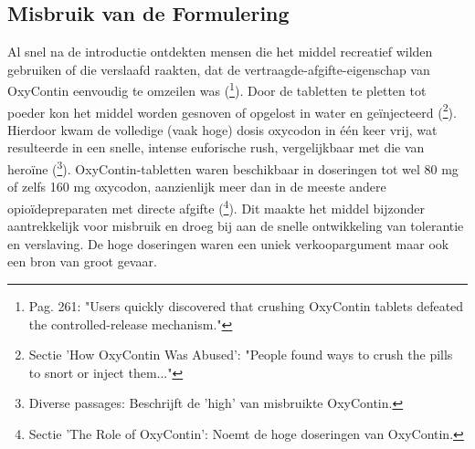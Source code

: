\documentclass[11pt, a4paper]{report} %
\begin{document}
\subsection{Misbruik van de Formulering}
Al snel na de introductie ontdekten mensen die het middel recreatief wilden gebruiken of die verslaafd raakten, dat de vertraagde-afgifte-eigenschap van OxyContin eenvoudig te omzeilen was (\cite{Cicero2017Review}\footnote{Pag. 261: "Users quickly discovered that crushing OxyContin tablets defeated the controlled-release mechanism."}). Door de tabletten te pletten tot poeder kon het middel worden gesnoven of opgelost in water en geïnjecteerd (\cite{HealthlineDopesickTruth}\footnote{Sectie 'How OxyContin Was Abused': "People found ways to crush the pills to snort or inject them..."}). Hierdoor kwam de volledige (vaak hoge) dosis oxycodon in één keer vrij, wat resulteerde in een snelle, intense euforische rush, vergelijkbaar met die van heroïne (\cite{Macy2018Dopesick}\footnote{Diverse passages: Beschrijft de 'high' van misbruikte OxyContin.}). OxyContin-tabletten waren beschikbaar in doseringen tot wel 80 mg of zelfs 160 mg oxycodon, aanzienlijk meer dan in de meeste andere opioïdepreparaten met directe afgifte (\cite{CRS2022OpioidCrisisHistory}\footnote{Sectie 'The Role of OxyContin': Noemt de hoge doseringen van OxyContin.}). Dit maakte het middel bijzonder aantrekkelijk voor misbruik en droeg bij aan de snelle ontwikkeling van tolerantie en verslaving. De hoge doseringen waren een uniek verkoopargument maar ook een bron van groot gevaar.
\end{document}
